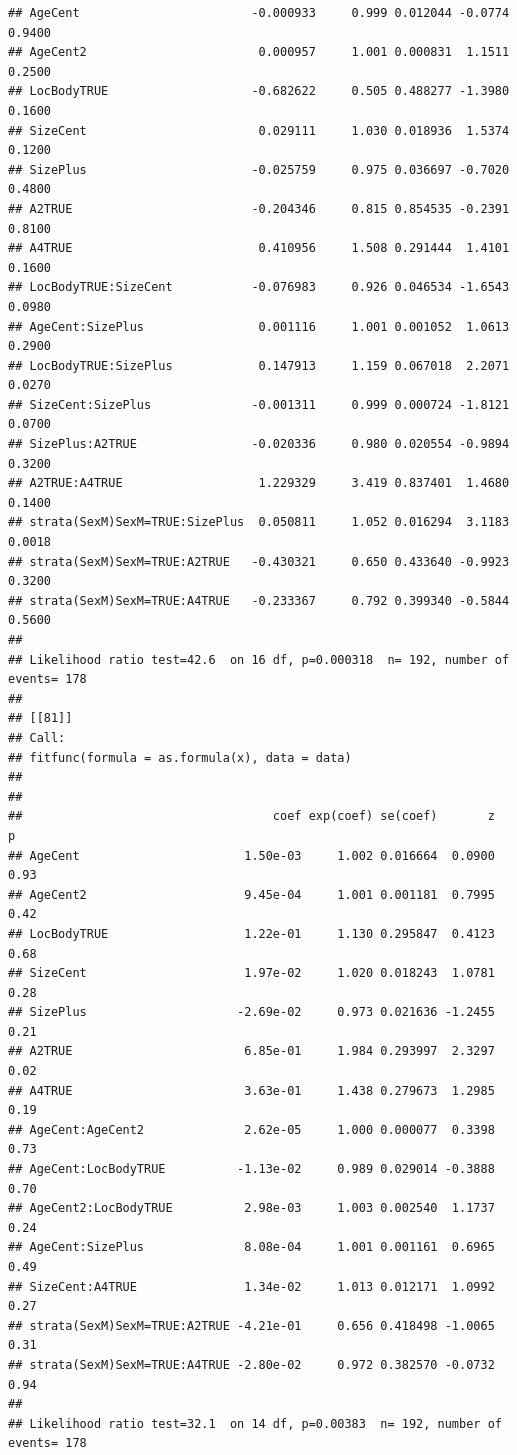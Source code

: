 \documentclass{article}\usepackage[]{graphicx}\usepackage[]{color}
\makeatletter
\newenvironment{kframe}{%
 \def\at@end@of@kframe{}%
 \ifinner\ifhmode%
  \def\at@end@of@kframe{\end{minipage}}%
  \begin{minipage}{\columnwidth}%
 \fi\fi%
 \def\FrameCommand##1{\hskip\@totalleftmargin \hskip-\fboxsep
 \colorbox{shadecolor}{##1}\hskip-\fboxsep
     \hskip-\linewidth \hskip-\@totalleftmargin \hskip\columnwidth}%
 \MakeFramed {\advance\hsize-\width
   \@totalleftmargin\z@ \linewidth\hsize
   \@setminipage}}%
 {\par\unskip\endMakeFramed%
 \at@end@of@kframe}
\newenvironment{knitrout}{}{} %
\makeatother
\begin{document}
\begin{knitrout}
\begin{kframe}
\begin{verbatim}
## AgeCent                        -0.000933     0.999 0.012044 -0.0774 0.9400
## AgeCent2                        0.000957     1.001 0.000831  1.1511 0.2500
## LocBodyTRUE                    -0.682622     0.505 0.488277 -1.3980 0.1600
## SizeCent                        0.029111     1.030 0.018936  1.5374 0.1200
## SizePlus                       -0.025759     0.975 0.036697 -0.7020 0.4800
## A2TRUE                         -0.204346     0.815 0.854535 -0.2391 0.8100
## A4TRUE                          0.410956     1.508 0.291444  1.4101 0.1600
## LocBodyTRUE:SizeCent           -0.076983     0.926 0.046534 -1.6543 0.0980
## AgeCent:SizePlus                0.001116     1.001 0.001052  1.0613 0.2900
## LocBodyTRUE:SizePlus            0.147913     1.159 0.067018  2.2071 0.0270
## SizeCent:SizePlus              -0.001311     0.999 0.000724 -1.8121 0.0700
## SizePlus:A2TRUE                -0.020336     0.980 0.020554 -0.9894 0.3200
## A2TRUE:A4TRUE                   1.229329     3.419 0.837401  1.4680 0.1400
## strata(SexM)SexM=TRUE:SizePlus  0.050811     1.052 0.016294  3.1183 0.0018
## strata(SexM)SexM=TRUE:A2TRUE   -0.430321     0.650 0.433640 -0.9923 0.3200
## strata(SexM)SexM=TRUE:A4TRUE   -0.233367     0.792 0.399340 -0.5844 0.5600
## 
## Likelihood ratio test=42.6  on 16 df, p=0.000318  n= 192, number of events= 178 
## 
## [[81]]
## Call:
## fitfunc(formula = as.formula(x), data = data)
## 
## 
##                                   coef exp(coef) se(coef)       z    p
## AgeCent                       1.50e-03     1.002 0.016664  0.0900 0.93
## AgeCent2                      9.45e-04     1.001 0.001181  0.7995 0.42
## LocBodyTRUE                   1.22e-01     1.130 0.295847  0.4123 0.68
## SizeCent                      1.97e-02     1.020 0.018243  1.0781 0.28
## SizePlus                     -2.69e-02     0.973 0.021636 -1.2455 0.21
## A2TRUE                        6.85e-01     1.984 0.293997  2.3297 0.02
## A4TRUE                        3.63e-01     1.438 0.279673  1.2985 0.19
## AgeCent:AgeCent2              2.62e-05     1.000 0.000077  0.3398 0.73
## AgeCent:LocBodyTRUE          -1.13e-02     0.989 0.029014 -0.3888 0.70
## AgeCent2:LocBodyTRUE          2.98e-03     1.003 0.002540  1.1737 0.24
## AgeCent:SizePlus              8.08e-04     1.001 0.001161  0.6965 0.49
## SizeCent:A4TRUE               1.34e-02     1.013 0.012171  1.0992 0.27
## strata(SexM)SexM=TRUE:A2TRUE -4.21e-01     0.656 0.418498 -1.0065 0.31
## strata(SexM)SexM=TRUE:A4TRUE -2.80e-02     0.972 0.382570 -0.0732 0.94
## 
## Likelihood ratio test=32.1  on 14 df, p=0.00383  n= 192, number of events= 178 

\end{verbatim}
\end{kframe}
\end{knitrout}
\end{document}
